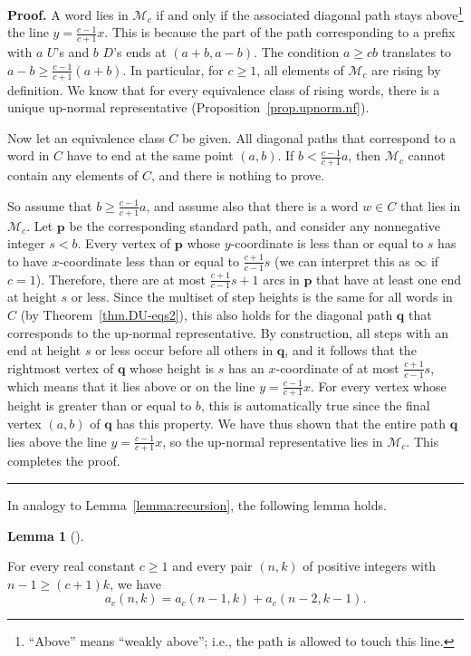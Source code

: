 \documentclass[numbers=enddot,12pt,final,onecolumn,notitlepage]{scrartcl}%
\theoremstyle{definition}
\newtheorem{lem}[theo]{Lemma}
\newenvironment{lemma}[1][]
{\begin{lem}[#1]\begin{leftbar}}
{\end{leftbar}\end{lem}}
\newenvironment{proof}[1][Proof]{\noindent\textbf{#1.} }{\ \rule{0.5em}{0.5em}}
\newcommand{\M}{\mathcal{M}}
\newcommand{\pp}{\mathbf{p}}
\newcommand{\qq}{\mathbf{q}}
\begin{document}
\begin{proof}
A word lies in $\M_c$ if and only if the associated diagonal path stays above\footnote{``Above'' means ``weakly above''; i.e., the path is allowed to touch this line.} the line $y = \frac{c-1}{c+1} x$. This is because the part of the path corresponding to a prefix with $a$ $U$'s and $b$ $D$'s ends at $(a+b,a-b)$. The condition $a \geq cb$ translates to $a-b \geq \frac{c-1}{c+1} (a+b)$. In particular, for $c \geq 1$, all elements of $\M_c$ are rising by definition. We know that for every equivalence class of rising words, there is a unique up-normal representative (Proposition~\ref{prop.upnorm.nf}).

Now let an equivalence class $C$ be given. All diagonal paths that correspond to a word in $C$ have to end at the same point $(a,b)$. If $b < \frac{c-1}{c+1} a$, then $\M_c$ cannot contain any elements of $C$, and there is nothing to prove. 

So assume that $b \geq \frac{c-1}{c+1} a$, and assume also that there is a word $w \in C$ that lies in $\M_c$. Let $\pp$ be the corresponding standard path, and consider any nonnegative integer $s < b$. Every vertex of $\pp$ whose $y$-coordinate is less than or equal to $s$ has to have $x$-coordinate less than or equal to $\frac{c+1}{c-1} s$ (we can interpret this as $\infty$ if $c = 1$). Therefore, there are at most $\frac{c+1}{c-1}s + 1$ arcs in $\pp$ that have at least one end at height $s$ or less. Since the multiset of step heights is the same for all words in $C$ (by Theorem~\ref{thm.DU-eqs2}), this also holds for the diagonal path $\qq$ that corresponds to the up-normal representative. By construction, all steps with an end at height $s$ or less occur before all others in $\qq$, and it follows that the rightmost vertex of $\qq$ whose height is $s$ has an $x$-coordinate of at most $\frac{c+1}{c-1}s$, which means that it lies above or on the line $y = \frac{c-1}{c+1} x$. For every vertex whose height is greater than or equal to $b$, this is automatically true since the final vertex $(a,b)$ of $\qq$ has this property. We have thus shown that the entire path $\qq$ lies above the line $y = \frac{c-1}{c+1} x$, so the up-normal representative lies in $\M_c$. This completes the proof.
\end{proof}

In analogy to Lemma~\ref{lemma:recursion}, the following lemma holds.

\begin{lemma}
\label{lemma:recursion2}
For every real constant $c \geq 1$ and every pair $(n,k)$ of positive integers with $n-1 \geq (c+1)k$, we have
\begin{equation}\label{eq:general_rec}
a_c(n, k) = a_c(n-1, k) + a_c(n-2, k-1).
\end{equation}
\end{lemma}
\end{document}
